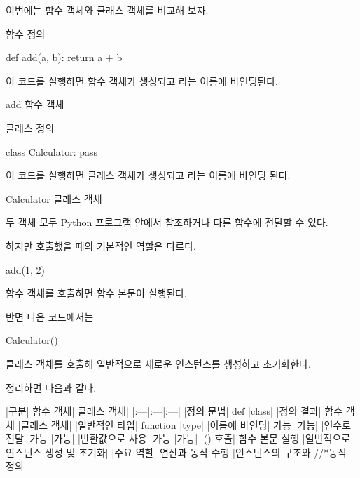 이번에는 함수 객체와 클래스 객체를 비교해 보자.

\begin{dhknote}
\begin{dhksmry}[centered]
함수 정의
\end{dhksmry}
\end{dhknote}

\begin{dhkcode}
def add(a, b):
    return a + b
\end{dhkcode}

이 코드를 실행하면 함수 객체가 생성되고 라는 이름에 바인딩된다.

\begin{dhksmry}
    add \ra 함수 객체
\end{dhksmry}

\begin{dhknote}
\begin{dhksmry}[centered]
클래스 정의
\end{dhksmry}
\end{dhknote}

\begin{dhkcode}
class Calculator:
    pass
\end{dhkcode}

이 코드를 실행하면 클래스 객체가 생성되고 라는 이름에 바인딩 된다.

\begin{dhksmry}
    Calculator \ra 클래스 객체
\end{dhksmry}

두 객체 모두 Python 프로그램 안에서 참조하거나 다른 함수에 전달할 수 있다.

하지만 호출했을 때의 기본적인 역할은 다르다.

\begin{dhkcode}
add(1, 2)
\end{dhkcode}

함수 객체를 호출하면 함수 본문이 실행된다.

반면 다음 코드에서는

\begin{dhkcode}
Calculator()
\end{dhkcode}

클래스 객체를 호출해 일반적으로 새로운 인스턴스를 생성하고 초기화한다.

정리하면 다음과 같다.

\begin{dhktable}
|구분|	함수 객체|	클래스 객체|
|:---|:---|:---|
|정의 문법|	def	|class|
|정의 결과|	함수 객체	|클래스 객체|
|일반적인 타입|	function	|type|
|이름에 바인딩|	가능	|가능|
|인수로 전달|	가능	|가능|
|반환값으로 사용|	가능	|가능|
|() 호출|	함수 본문 실행	|일반적으로 인스턴스 생성 및 초기화|
|주요 역할|	연산과 동작 수행	|인스턴스의 구조와 //*동작 정의|
\end{dhktable}

